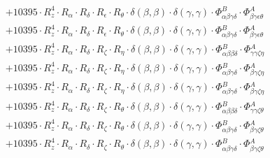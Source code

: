 \documentclass{article}
\begin{document}
\begin{subequations}
\begin{gather}
\begin{array}{c}
 \\[0.2em] 		 + 10395 \cdot R_{z}^{4} \cdot R_{\alpha{}} \cdot R_{\delta{}} \cdot R_{\epsilon{}} \cdot R_{\theta{}} \cdot \delta{}\left(\beta{}, \beta{}\right) \cdot \delta{}\left(\gamma{}, \gamma{}\right) \cdot \Phi{}^{B}_{\alpha{}\beta{}\gamma{}\delta{}} \cdot \Phi{}^{A}_{\beta{}\gamma{}\epsilon{}\theta{}} 
 \\[0.2em] 		 + 10395 \cdot R_{z}^{4} \cdot R_{\alpha{}} \cdot R_{\delta{}} \cdot R_{\epsilon{}} \cdot R_{\theta{}} \cdot \delta{}\left(\beta{}, \beta{}\right) \cdot \delta{}\left(\gamma{}, \gamma{}\right) \cdot \Phi{}^{B}_{\alpha{}\beta{}\gamma{}\delta{}} \cdot \Phi{}^{A}_{\beta{}\gamma{}\epsilon{}\theta{}} 
 \\[0.2em] 		 + 10395 \cdot R_{z}^{4} \cdot R_{\alpha{}} \cdot R_{\delta{}} \cdot R_{\zeta{}} \cdot R_{\eta{}} \cdot \delta{}\left(\beta{}, \beta{}\right) \cdot \delta{}\left(\gamma{}, \gamma{}\right) \cdot \Phi{}^{B}_{\alpha{}\beta{}\beta{}\delta{}} \cdot \Phi{}^{A}_{\gamma{}\gamma{}\zeta{}\eta{}} 
 \\[0.2em] 		 + 10395 \cdot R_{z}^{4} \cdot R_{\alpha{}} \cdot R_{\delta{}} \cdot R_{\zeta{}} \cdot R_{\eta{}} \cdot \delta{}\left(\beta{}, \beta{}\right) \cdot \delta{}\left(\gamma{}, \gamma{}\right) \cdot \Phi{}^{B}_{\alpha{}\beta{}\gamma{}\delta{}} \cdot \Phi{}^{A}_{\beta{}\gamma{}\zeta{}\eta{}} 
 \\[0.2em] 		 + 10395 \cdot R_{z}^{4} \cdot R_{\alpha{}} \cdot R_{\delta{}} \cdot R_{\zeta{}} \cdot R_{\eta{}} \cdot \delta{}\left(\beta{}, \beta{}\right) \cdot \delta{}\left(\gamma{}, \gamma{}\right) \cdot \Phi{}^{B}_{\alpha{}\beta{}\gamma{}\delta{}} \cdot \Phi{}^{A}_{\beta{}\gamma{}\zeta{}\eta{}} 
 \\[0.2em] 		 + 10395 \cdot R_{z}^{4} \cdot R_{\alpha{}} \cdot R_{\delta{}} \cdot R_{\zeta{}} \cdot R_{\theta{}} \cdot \delta{}\left(\beta{}, \beta{}\right) \cdot \delta{}\left(\gamma{}, \gamma{}\right) \cdot \Phi{}^{B}_{\alpha{}\beta{}\beta{}\delta{}} \cdot \Phi{}^{A}_{\gamma{}\gamma{}\zeta{}\theta{}} 
 \\[0.2em] 		 + 10395 \cdot R_{z}^{4} \cdot R_{\alpha{}} \cdot R_{\delta{}} \cdot R_{\zeta{}} \cdot R_{\theta{}} \cdot \delta{}\left(\beta{}, \beta{}\right) \cdot \delta{}\left(\gamma{}, \gamma{}\right) \cdot \Phi{}^{B}_{\alpha{}\beta{}\gamma{}\delta{}} \cdot \Phi{}^{A}_{\beta{}\gamma{}\zeta{}\theta{}} 
 \\[0.2em] 		 + 10395 \cdot R_{z}^{4} \cdot R_{\alpha{}} \cdot R_{\delta{}} \cdot R_{\zeta{}} \cdot R_{\theta{}} \cdot \delta{}\left(\beta{}, \beta{}\right) \cdot \delta{}\left(\gamma{}, \gamma{}\right) \cdot \Phi{}^{B}_{\alpha{}\beta{}\gamma{}\delta{}} \cdot \Phi{}^{A}_{\beta{}\gamma{}\zeta{}\theta{}} 

\end{array}
\end{gather}
\end{subequations}
\end{document}
